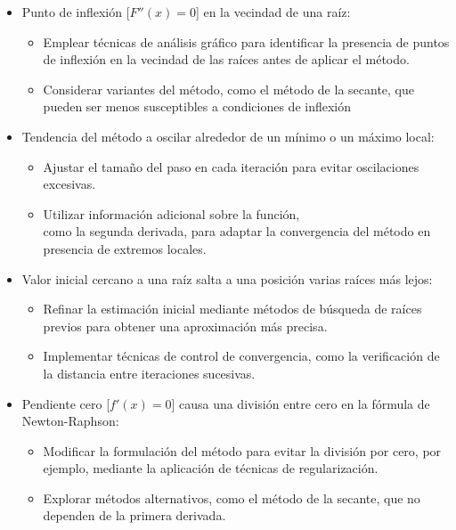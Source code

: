 \documentclass[conference]{IEEEtran}
\begin{document}
\begin{itemize}
	\item Punto de inflexión [$F''(x) = 0$] en la vecindad de una raíz:
	      \begin{itemize}
		      \item Emplear técnicas de análisis gráfico para identificar
		            la presencia de puntos de inflexión en la vecindad de las
		            raíces antes de aplicar el método.

		      \item Considerar variantes del método, como el método de la
		            secante, que pueden ser menos susceptibles a condiciones de
		            inflexión
	      \end{itemize}

	\item Tendencia del método a oscilar alrededor de un mínimo o un máximo
	      local:
	      \begin{itemize}
		      \item Ajustar el tamaño del paso en cada iteración para evitar
		            oscilaciones excesivas.

		      \item Utilizar información adicional sobre la función, \\ como
		            la segunda derivada, para adaptar la convergencia del método
		            en presencia de extremos locales.
	      \end{itemize}

	\item Valor inicial cercano a una raíz salta a una posición varias
	      raíces más lejos:
	      \begin{itemize}
		      \item Refinar la estimación inicial mediante métodos de búsqueda de
		            raíces previos para obtener una aproximación más precisa.

		      \item Implementar técnicas de control de convergencia, como la
		            verificación de la distancia entre iteraciones sucesivas.
	      \end{itemize}

	\item Pendiente cero [$f'(x) = 0$] causa una división entre cero en la
	      fórmula de Newton-Raphson:
	      \begin{itemize}
		      \item Modificar la formulación del método para evitar la división
		            por cero, por ejemplo, mediante la aplicación de técnicas de
		            regularización.
		      \item Explorar métodos alternativos, como el método de la
		            secante, que no dependen de la primera derivada.

	      \end{itemize}
\end{itemize}
\end{document}
